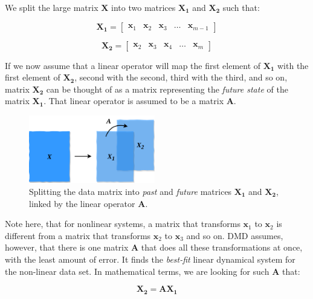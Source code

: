\documentclass[10pt,twocolumn]{article}
\begin{document}
We split the large matrix $\mathbf{X}$ into two matrices $\mathbf{X_1}$ and $\mathbf{X_2}$ such that:

\begin{equation} \label{eq:X1}
\mathbf{X_1} = 
\begin{bmatrix}
    \mathbf{x}_1 & \mathbf{x}_2 & \mathbf{x}_3 & \dots & \mathbf{x}_{m-1}
\end{bmatrix}
\end{equation}

\begin{equation} \label{eq:X2}
\mathbf{X_2} = 
\begin{bmatrix}
    \mathbf{x}_2 & \mathbf{x}_3 & \mathbf{x}_4 & \dots & \mathbf{x}_{m}
\end{bmatrix}
\end{equation}

If we now assume that a linear operator will map the first element of $\mathbf{X_1}$ with the first element of $\mathbf{X_2}$, second with the second, third with the third, and so on, matrix $\mathbf{X_2}$ can be thought of as a matrix representing the \textit{future state} of the matrix $\mathbf{X_1}$. That linear operator is assumed to be a matrix $\mathbf{A}$. 

\begin{figure}[H]
\centering\includegraphics[width=5.5cm]{data-split.png}
\caption{Splitting the data matrix into \textit{past} and \textit{future} matrices $\mathbf{X_1}$ and $\mathbf{X_2}$, linked by the linear operator $\mathbf{A}$.}
\label{fig:linear_system}
\end{figure}

Note here, that for nonlinear systems, a matrix that transforms $\mathbf{x}_1$ to $\mathbf{x}_2$ is different from a matrix that transforms $\mathbf{x}_2$ to $\mathbf{x}_3$ and so on. DMD assumes, however, that there is one matrix $\mathbf{A}$ that does all these transformations at once, with the least amount of error. It finds the \textit{best-fit} linear dynamical system for the non-linear data set. In mathematical terms, we are looking for such $\mathbf{A}$ that:

\begin{equation} \label{eq:linear_dynamics}
\mathbf{X_2} = \mathbf{A} \mathbf{X_1}
\end{equation}
\end{document}
